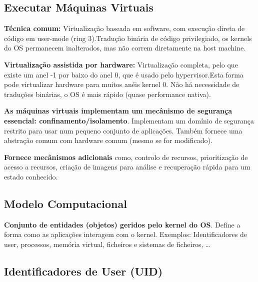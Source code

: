 \documentclass{article}
\begin{document}
\subsection{Executar Máquinas Virtuais}

\begin{flushleft}
  \textbf{Técnica comum:} Virtualização baseada em software, com execução direta
  de código em user-mode (ring 3).Tradução binária de código privilegiado,
  os kernels do OS permanecem inalterados, mas não correm diretamente na host machine.

  \vspace{2mm}

  \textbf{Virtualização assistida por hardware:} Virtualização completa, pelo que existe
  um anel -1 por baixo do anel 0, que é usado pelo hypervisor.Esta forma pode
  virtualizar hardware para muitos anéis kernel 0. Não há necessidade de traduções
  binárias, o OS é mais rápido (quase performance nativa).

  \vspace{2mm}

  \textbf{As máquinas virtuais implementam um mecânismo de segurança essencial: confinamento/isolamento}.
  Implementam um domínio de segurança restrito para usar num pequeno conjunto
  de aplicações. Também fornece uma abstração comum com hardware comum (mesmo
  se for modificado).

  \vspace{2mm}

  \textbf{Fornece mecânismos adicionais} como, controlo de recursos,
  prioritização de acesso a recursos, criação de imagens para análise e
  recuperação rápida para um estado conhecido.
\end{flushleft}

\pagebreak

\subsection{Modelo Computacional}

\begin{flushleft}
  \textbf{Conjunto de entidades (objetos) geridos pelo kernel do OS}. Define
  a forma como as aplicações interagem com o kernel. Exemplos:
  Identificadores de user, processos, memória virtual, ficheiros e sistemas
  de ficheiros, \dots 
\end{flushleft}

\subsection{Identificadores de User (UID)}
\end{document}
